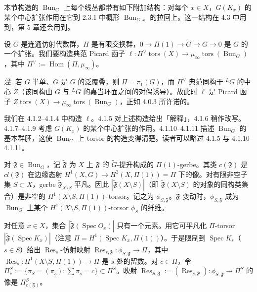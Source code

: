 本节构造的 $\operatorname{Bun}_G$ 上每个线丛都带有如下附加结构：对每个 $x\in X$，$G(K_x)$ 的某个中心扩张作用在它到 2.3.1 中概形 $\operatorname{Bun}_{G,x}$ 的拉回上。这一结构在 4.3 中用到，第 5 章还会用到。



 设 $G$ 是连通仿射代数群，$\Pi$ 是有限交换群，$0\to\Pi(1)\to\tilde G\to G\to 0$ 是 $G$ 的一个扩张。我们要构造典范 Picard 函子 $\ell:\Pi^{\vee}\operatorname{tors}(X)\to\mu_\infty\operatorname{tors}(\operatorname{Bun}_G)$，其中 $\Pi^{\vee}:=\operatorname{Hom}(\Pi,\mu_\infty)$。

\emph{注.} 若 $G$ 半单、$\tilde G$ 是 $G$ 的泛覆叠，则 $\Pi=\pi_1(G)$，而 $\Pi^{\vee}$ 典范同构于 ${}^{L}G$ 的中心 $Z$（该同构由 $G$ 与 ${}^{L}G$ 的嘉当环面之间的对偶诱导）。故此时 $\ell$ 是 Picard 函子 $Z\operatorname{tors}(X)\to\mu_\infty\operatorname{tors}(\operatorname{Bun}_G)$，正如 4.0.3 所许诺的。

我们在 4.1.2–4.1.4 中构造 $\ell$。4.1.5 对上述构造给出「解释」，4.1.6 稍作改写。4.1.7–4.1.9 考虑 $G(K_x)$ 的某个中心扩张的作用。4.1.10–4.1.11 描述 $\operatorname{Bun}_G$ 的基本群胚，这使 $\operatorname{Bun}_G$ 上 torsor 的构造变得清楚。读者可以略过 4.1.5 与 4.1.10–4.1.11。

 对 $\mathfrak{F}\in\operatorname{Bun}_G$，记 $\tilde{\mathfrak{F}}$ 为 $X$ 上 $\mathfrak{F}$ 的 $\tilde G$-提升构成的 $\Pi(1)$-gerbe。其类 $c(\mathfrak{F})$ 是 $cl(\mathfrak{F})$ 在边缘态射 $H^1(X,G)\to H^2(X,\Pi(1))=\Pi$ 下的像。对有限非空子集 $S\subset X$，gerbe $\tilde{\mathfrak{F}}_{X\setminus S}$ 平凡。因此 $|\tilde{\mathfrak{F}}(X\setminus S)|$（即 $\tilde{\mathfrak{F}}(X\setminus S)$ 的对象的同构类集合）是非空的 $H^1(X\setminus S,\Pi(1))$-torsor。记之为 $\phi_{S,\mathfrak{F}}$。$\mathfrak{F}$ 变动时，$\phi_{S,\mathfrak{F}}$ 成为 $\operatorname{Bun}_G$ 上某个 $H^1(X\setminus S,\Pi(1))$-torsor $\phi_S$ 的纤维。

 对任意 $x\in X$，集合 $|\tilde{\mathfrak{F}}(\operatorname{Spec} O_x)|$ 只有一个元素。用它可平凡化 $\Pi$-torsor $|\tilde{\mathfrak{F}}(\operatorname{Spec} K_x)|$（注意 $\Pi=H^1(\operatorname{Spec} K_x,\Pi(1))$）。于是限制到 $\operatorname{Spec} K_s$（$s\in S$）给出 $\operatorname{Res}_s$-仿射映射 $\operatorname{Res}_{s,\mathfrak{F}}:\phi_{S,\mathfrak{F}}\to\Pi$，其中 $\operatorname{Res}_s:H^1(X\setminus S,\Pi(1))\to\Pi$ 是 $s$ 处的留数。对 $c\in\Pi$，令 $\Pi^S_c:=\{\pi_S=(\pi_s):\sum\pi_s=c\}\subset\Pi^S$。映射 $\operatorname{Res}_{S,\mathfrak{F}}:=(\operatorname{Res}_{s,\mathfrak{F}}):\phi_{S,\mathfrak{F}}\to\Pi^S$ 的像是 $\Pi^S_{c(\mathfrak{F})}$。

